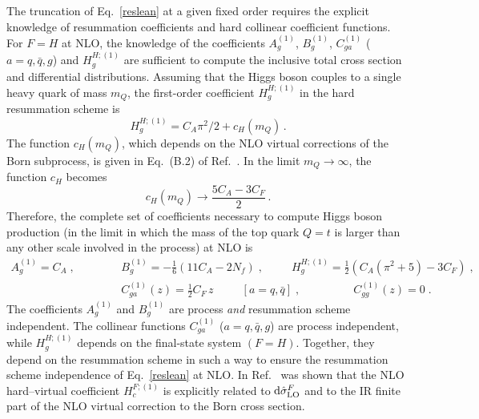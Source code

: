 \documentclass[12pt]{article}
\DeclareRobustCommand{\nn}{\nonumber}
\def\beeq{\begin{eqnarray}}
\def\eeeq{\end{eqnarray}}
\DeclareRobustCommand{\rd}{\ensuremath{\mathrm{d}}}
\begin{document}
\begin{appendix}
The truncation of Eq.~\eqref{reslean} at a given fixed order requires the explicit knowledge of resummation coefficients and hard collinear coefficient functions.
For $F=H$ at NLO, the knowledge of the coefficients $A^{(1)}_{g}$, $B^{(1)}_{g}$, $C^{(1)}_{ga}$ ($a=q,{\bar q},g$) and $H^{H;(1)}_{g}$ are sufficient to compute the inclusive total cross section and differential distributions. Assuming that the Higgs boson couples to a single heavy quark of mass $m_Q$, the first-order coefficient $H_g^{H;(1)}$ in the hard resummation scheme is~\cite{Catani:2013tia}
\begin{equation}
\label{H1g}
H_g^{H;(1)}=C_A\pi^2/2+c_H(m_Q)\, .
\end{equation}
The function $c_H(m_Q)$, which depends on the NLO virtual corrections of the Born subprocess, is given in Eq.~(B.2) of Ref.~\cite{Spira:1995rr}. In the limit $m_Q\to \infty$, the function $c_H$ becomes
\begin{equation}
c_H(m_Q)\longrightarrow\frac{5C_A-3C_F}{2}\, .
\end{equation}
Therefore, the complete set of coefficients necessary to compute Higgs boson production (in the limit in which the mass of the top quark $Q=t$ is larger than any other scale involved in the process) at NLO is
\beeq
\label{eq:nloconstants}
A^{(1)}_{g}=C_{A}\;,\;\;\;\;\;\;\;\;\;&&B^{(1)}_{g}=- \frac{1}{6} \left( 11 C_A - 2 N_f \right)\;,\;\;\;\;\;\;\;\;\;H^{H;(1)}_{g}=\frac{1}{2}(C_{A}(\pi^{2}+5)-3 C_{F})\;,\nn\\
&&\!\!\!\!\!\!\!\!\!\!\!\!\!\!\!\!\!\!\!\!\!\!\!\!\!\!\!\!\!\!\!\!\!C^{(1)}_{ga}(z)=\frac{1}{2}C_F\, z\;\;\;\;\;\;\;\;\;\left[a=q,{\bar q}\right]\;,\;\;\;\;\;\;\;\;\;\;\;\;\;\;\;\;\;C^{(1)}_{gg}(z)=0\;.
\eeeq
The coefficients $A^{(1)}_{g}$ and $B^{(1)}_{g}$ are process \emph{and} resummation scheme independent. The collinear functions $C^{(1)}_{ga}$ ($a=q,{\bar q},g$) are process independent, while $H^{H;(1)}_{g}$ depends on the final-state system $(F=H)$. Together,  they depend on the resummation scheme in such a way to ensure the resummation scheme independence of Eq.~\eqref{reslean} at NLO. In Ref.~\cite{deFlorian:2001zd} was shown that the NLO hard--virtual coefficient $H^{F;(1)}_{c}$ is explicitly related to $\rd{\hat \sigma}^{F}_{\rm LO}$ and to the IR finite part of the NLO virtual correction to the Born cross section. 


\end{appendix}
\end{document}

